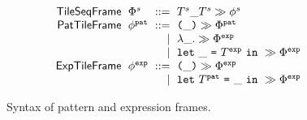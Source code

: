\begin{figure}
  \vspace{-3px}
  \[
  \arraycolsep=3pt\begin{array}{rlrl}
      \mathsf{TileSeqFrame} & \tframe^s & ::= & \tframelit{\tiles^s\_\tiles^s}{\tfrelem^s} \\
      \mathsf{PatTileFrame} & \tfrelem^{\pat} & ::= &
        \tframelit{\sparen{\_}}{\tframe^{\pat}} \\
      & & \vert &
        \tframelit{\slam{\_}{}}{\tframe^{\expr}} \\
      & & \vert &
        \tframelit{\slet{\_}{\tiles^{\expr}}{}}{\tframe^{\expr}} \\
      \mathsf{ExpTileFrame} & \tfrelem^{\expr} & ::= &
        \tframelit{\sparen{\_}}{\tframe^{\expr}} \\
      & & \vert &
        \tframelit{\slet{\tiles^{\pat}}{\_}{}}{\tframe^{\expr}}
  \end{array}\]
  \caption{
    Syntax of pattern and expression frames.
  }
  \label{fig:tile-syntax}
\end{figure}
